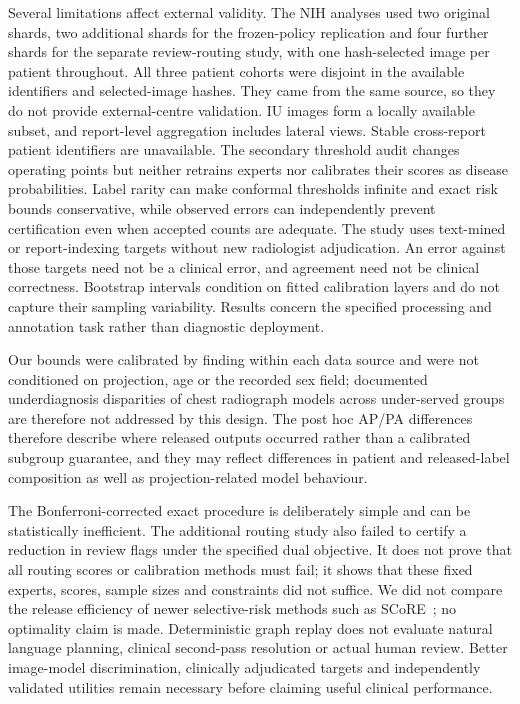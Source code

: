 \documentclass[10pt,a4paper]{article}
\begin{document}
Several limitations affect external validity. The NIH analyses used two original shards, two additional shards for the frozen-policy replication and four further shards for the separate review-routing study, with one hash-selected image per patient throughout. All three patient cohorts were disjoint in the available identifiers and selected-image hashes. They came from the same source, so they do not provide external-centre validation. IU images form a locally available subset, and report-level aggregation includes lateral views. Stable cross-report patient identifiers are unavailable. The secondary threshold audit changes operating points but neither retrains experts nor calibrates their scores as disease probabilities. Label rarity can make conformal thresholds infinite and exact risk bounds conservative, while observed errors can independently prevent certification even when accepted counts are adequate. The study uses text-mined or report-indexing targets without new radiologist adjudication. An error against those targets need not be a clinical error, and agreement need not be clinical correctness. Bootstrap intervals condition on fitted calibration layers and do not capture their sampling variability. Results concern the specified processing and annotation task rather than diagnostic deployment.

Our bounds were calibrated by finding within each data source and were not conditioned on projection, age or the recorded sex field; documented underdiagnosis disparities of chest radiograph models across under-served groups~\cite{seyyedkalantari} are therefore not addressed by this design. The post hoc AP/PA differences therefore describe where released outputs occurred rather than a calibrated subgroup guarantee, and they may reflect differences in patient and released-label composition as well as projection-related model behaviour.

The Bonferroni-corrected exact procedure is deliberately simple and can be statistically inefficient. The additional routing study also failed to certify a reduction in review flags under the specified dual objective. It does not prove that all routing scores or calibration methods must fail; it shows that these fixed experts, scores, sample sizes and constraints did not suffice. We did not compare the release efficiency of newer selective-risk methods such as SCoRE~\cite{score}; no optimality claim is made. Deterministic graph replay does not evaluate natural language planning, clinical second-pass resolution or actual human review. Better image-model discrimination, clinically adjudicated targets and independently validated utilities remain necessary before claiming useful clinical performance.
\end{document}
